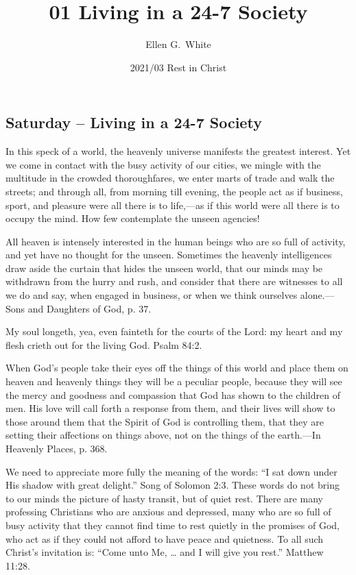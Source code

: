 \documentclass[a4paper, 10pt, twoside, headings=small]{scrartcl}
\title{01 Living in a 24-7 Society}
\author{Ellen G.\ White}
\date{2021/03 Rest in Christ}
\begin{document}
\maketitle

\thispagestyle{empty}

\pagestyle{fancy}

\begin{multicols}{2}

\section*{Saturday – Living in a 24-7 Society}

In this speck of a world, the heavenly universe manifests the greatest interest. Yet we come in contact with the busy activity of our cities, we mingle with the multitude in the crowded thoroughfares, we enter marts of trade and walk the streets; and through all, from morning till evening, the people act as if business, sport, and pleasure were all there is to life,—as if this world were all there is to occupy the mind. How few contemplate the unseen agencies!

All heaven is intensely interested in the human beings who are so full of activity, and yet have no thought for the unseen. Sometimes the heavenly intelligences draw aside the curtain that hides the unseen world, that our minds may be withdrawn from the hurry and rush, and consider that there are witnesses to all we do and say, when engaged in business, or when we think ourselves alone.—Sons and Daughters of God, p. 37.

My soul longeth, yea, even fainteth for the courts of the Lord: my heart and my flesh crieth out for the living God. Psalm 84:2.

When God’s people take their eyes off the things of this world and place them on heaven and heavenly things they will be a peculiar people, because they will see the mercy and goodness and compassion that God has shown to the children of men. His love will call forth a response from them, and their lives will show to those around them that the Spirit of God is controlling them, that they are setting their affections on things above, not on the things of the earth.—In Heavenly Places, p. 368.

We need to appreciate more fully the meaning of the words: “I sat down under His shadow with great delight.” Song of Solomon 2:3. These words do not bring to our minds the picture of hasty transit, but of quiet rest. There are many professing Christians who are anxious and depressed, many who are so full of busy activity that they cannot find time to rest quietly in the promises of God, who act as if they could not afford to have peace and quietness. To all such Christ’s invitation is: “Come unto Me, … and I will give you rest.” Matthew 11:28.


\end{multicols}
\end{document}
